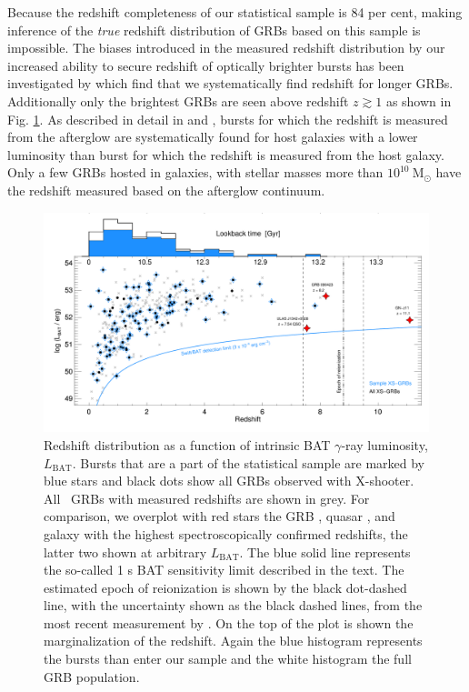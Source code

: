 \documentclass{aa}    %
\begin{document}
Because the redshift completeness of our statistical sample is 84 per cent,
making inference of the \textit{true} redshift distribution of GRBs based on
this sample is impossible. The biases introduced in the measured redshift
distribution by our increased ability to secure redshift of optically brighter
bursts has been investigated by \citet{Turpin2016} which find that we
systematically find redshift for longer GRBs. Additionally only the brightest
GRBs are seen above redshift $z \gtrsim 1$ as shown in Fig. \ref{fig:z}. As
described in detail in \citet{Hjorth2012} and \citet{Perley2016b}, bursts for which the redshift is
measured from the afterglow are systematically found for host galaxies with a
lower luminosity than burst for which the redshift is measured from the host
galaxy. Only a few GRBs hosted in galaxies, with stellar masses more than
$10^{10}~\mathrm{M}_\odot$ have the redshift measured based on the afterglow
continuum.



\begin{figure}
	\centering \includegraphics[width=16cm]{figures/XSGRB_redshift_swiftdots.pdf}
\caption{Redshift distribution as a function of intrinsic BAT $\gamma$-ray
	luminosity, $L_{\mathrm{BAT}}$. Bursts that are a part of the statistical
	sample are marked by blue stars and black dots show all GRBs observed with
	X-shooter. All \swift~GRBs with measured redshifts are shown in grey. For
	comparison, we overplot with red stars the GRB \citep{Tanvir2009b,
		Salvaterra2009a}, quasar \citep{Banados2017}, and galaxy \citep{Oesch2016} with
	the highest spectroscopically confirmed redshifts, the latter two shown at
	arbitrary $L_{\mathrm{BAT}}$. The blue solid line represents the so-called 1 s
	BAT sensitivity limit described in the text. The estimated epoch of
	reionization is shown by the black dot-dashed line, with the uncertainty shown
	as the black dashed lines, from the most recent measurement by
	\citet{Planck2015}. On the top of the plot is shown the marginalization of the
	redshift. Again the blue histogram represents the bursts than enter our sample
	and the white histogram the full GRB population. } \label{fig:z}
\end{figure}
\end{document}
